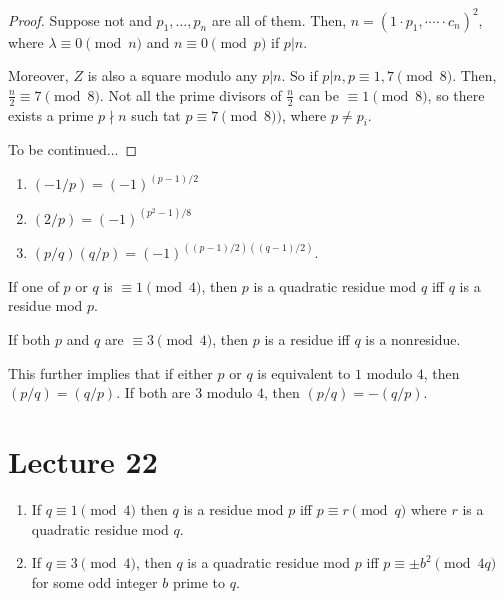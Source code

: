 \documentclass{article}
\begin{document}
\begin{proof}
	Suppose not and $p_1, \ldots, p_n$ are all of them. Then, $n = (1 \cdot p_1, \cdot \cdots \cdot c_n)^2$, where $\lambda \equiv 0 \pmod n$ and $ n \equiv 0 \pmod p$ if $p | n$.

	Moreover, $Z$ is also a square modulo any $p | n$. So if $p | n, p \equiv 1, 7 \pmod 8$. Then, $\frac{n}{2} \equiv 7 \pmod 8$. Not all the prime divisors of $\frac{n}{2}$ can be $\equiv 1 \pmod 8$, so there exists a prime $p \nmid n$ such tat $p \equiv 7 \pmod 8)$, where $p \neq p_i$. 

	To be continued...
\end{proof}

\begin{theorem}
	\label{qr}
	\begin{enumerate}[label=(\alph*)] 
		\item $(-1 / p) = (-1)^{(p-1)/2}$
		\item $(2 / p) = (-1)^{(p^2-1)/8}$
		\item $(p/q)(q/p) = (-1)^{((p-1)/2)((q-1)/2)}$.
	\end{enumerate}

	If one of $p$ or $q$ is $\equiv 1 \pmod 4$, then $p$ is a quadratic residue mod $q$ iff $q$ is a residue mod $p$. 

	If both $p$ and $q$ are $\equiv 3 \pmod 4$, then $p$ is a residue iff $q$ is a nonresidue.
\end{theorem}

This further implies that if either $p$ or $q$ is equivalent to $1$ modulo $4$, then $(p/q) = (q/p)$. If both are $3$ modulo $4$, then $(p/q) = -(q/p)$. 

\section{Lecture 22}
\begin{theorem}
	\begin{enumerate}[label=(\roman*)] 
		\item If $q \equiv 1 \pmod 4$ then $q$ is a residue mod $p$ iff $p \equiv r \pmod q$ where $r$ is a quadratic residue mod $q$. 
		\item If $q \equiv 3 \pmod 4$, then $q$ is a quadratic residue mod $p$ iff $p \equiv \pm b^2 \pmod{4q}$ for some odd integer $b$ prime to $q$.
	\end{enumerate}
\end{theorem}
\end{document}

